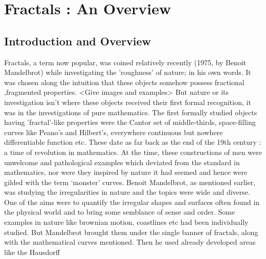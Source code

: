 
\chapter{Fractals : An Overview} %

\label{Chapter4} %


\section{Introduction and Overview}
Fractals, a term now popular, was coined relatively recently (1975, by Benoit
Mandelbrot) while investigating the 'roughness' of nature; in his own words.
It was chosen along the intuition that these objects somehow possess fractional
,fragmented properties.
<Give images and examples> 
\newline
But nature or its investigation isn't where these objects received their first
formal recognition, it was in the investigations of pure mathematics. The first
formally studied objects having 'fractal'-like properties were the Cantor set of
middle-thirds, space-filling curves like Peano's and Hilbert's,
everywhere continuous but nowhere differentiable function etc. These date as far
back as the end of the 19th century : a time of revolution in mathematics. 
At the time, these constructions of men
were unwelcome and pathological examples which deviated from the standard in
mathematics, nor were they inspired by nature it had
seemed and hence were gilded with
the term `monster' curves.
\newline
Benoit Mandelbrot, as mentioned earlier, was studying the irregularities in
nature and the topics were wide and diverse. One of the aims were to quantify
the irregular shapes and surfaces often found in the physical world
and to bring some semblance of sense and order. Some examples in nature like
brownian motion, coastlines etc had been individually studied. But Mandelbrot
brought them under the single banner of fractals, along with the mathematical
curves mentioned. Then he used already developed areas like the Hausdorff
